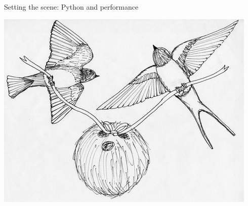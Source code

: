 \documentclass[aspectratio=169]{beamer}
\begin{document}
\begin{frame}{Setting the scene: Python and performance}
\vspace{0.3 cm}
\begin{center}
\includegraphics[width=0.7\linewidth]{img/swallows-coconut.jpg}
\end{center}
\end{frame}
\end{document}
